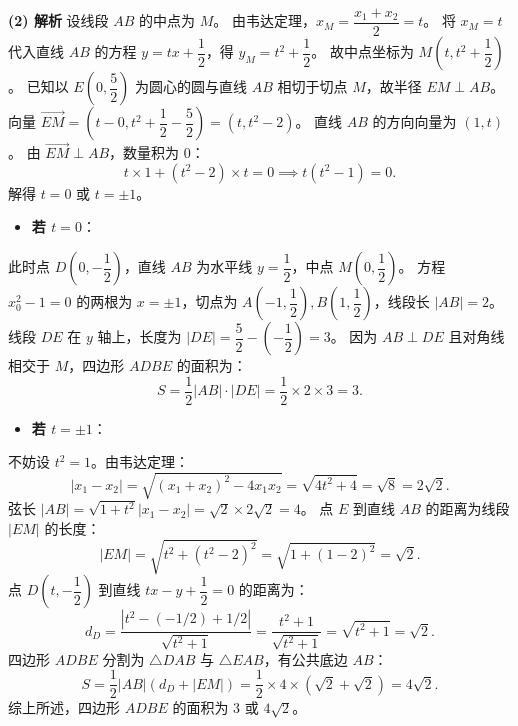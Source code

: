 \begin{answer}
\textbf{(2) 解析}
设线段 $AB$ 的中点为 $M$。
由韦达定理，$x_M = \dfrac{x_1 + x_2}{2} = t$。
将 $x_M = t$ 代入直线 $AB$ 的方程 $y = tx + \dfrac{1}{2}$，得 $y_M = t^2 + \dfrac{1}{2}$。
故中点坐标为 $M\left(t, t^2 + \dfrac{1}{2}\right)$。
已知以 $E\left(0, \dfrac{5}{2}\right)$ 为圆心的圆与直线 $AB$ 相切于切点 $M$，故半径 $EM \perp AB$。
向量 $\vec{EM} = \left(t - 0, t^2 + \dfrac{1}{2} - \dfrac{5}{2}\right) = (t, t^2 - 2)$。
直线 $AB$ 的方向向量为 $(1, t)$。
由 $\vec{EM} \perp AB$，数量积为 0：
\nopagebreak[4]
\[t \times 1 + (t^2 - 2) \times t = 0 \implies t(t^2 - 1) = 0.\]
解得 $t = 0$ 或 $t = \pm 1$。
\begin{itemize}
\item \textbf{若 $t = 0$}：
\end{itemize}
  此时点 $D\left(0, -\dfrac{1}{2}\right)$，直线 $AB$ 为水平线 $y = \dfrac{1}{2}$，中点 $M\left(0, \dfrac{1}{2}\right)$。
  方程 $x_0^2 - 1 = 0$ 的两根为 $x = \pm 1$，切点为 $A\left(-1, \dfrac{1}{2}\right), B\left(1, \dfrac{1}{2}\right)$，线段长 $|AB| = 2$。
  线段 $DE$ 在 $y$ 轴上，长度为 $|DE| = \dfrac{5}{2} - \left(-\dfrac{1}{2}\right) = 3$。
  因为 $AB \perp DE$ 且对角线相交于 $M$，四边形 $ADBE$ 的面积为：
\nopagebreak[4]
\[S = \frac{1}{2} |AB| \cdot |DE| = \frac{1}{2} \times 2 \times 3 = 3.\]
\begin{itemize}
\item \textbf{若 $t = \pm 1$}：
\end{itemize}
  不妨设 $t^2 = 1$。由韦达定理：
\nopagebreak[4]
\[|x_1 - x_2| = \sqrt{(x_1 + x_2)^2 - 4x_1 x_2} = \sqrt{4t^2 + 4} = \sqrt{8} = 2\sqrt{2}.\]
  弦长 $|AB| = \sqrt{1 + t^2} |x_1 - x_2| = \sqrt{2} \times 2\sqrt{2} = 4$。
  点 $E$ 到直线 $AB$ 的距离为线段 $|EM|$ 的长度：
\nopagebreak[4]
\[|EM| = \sqrt{t^2 + (t^2 - 2)^2} = \sqrt{1 + (1 - 2)^2} = \sqrt{2}.\]
  点 $D\left(t, -\dfrac{1}{2}\right)$ 到直线 $tx - y + \dfrac{1}{2} = 0$ 的距离为：
\nopagebreak[4]
\[d_D = \frac{|t^2 - (-1/2) + 1/2|}{\sqrt{t^2 + 1}} = \frac{t^2 + 1}{\sqrt{t^2 + 1}} = \sqrt{t^2 + 1} = \sqrt{2}.\]
  四边形 $ADBE$ 分割为 $\triangle DAB$ 与 $\triangle EAB$，有公共底边 $AB$：
\nopagebreak[4]
\[S = \frac{1}{2} |AB| (d_D + |EM|) = \frac{1}{2} \times 4 \times (\sqrt{2} + \sqrt{2}) = 4\sqrt{2}.\]
综上所述，四边形 $ADBE$ 的面积为 $3$ 或 $4\sqrt{2}$。



\par\medskip

\end{answer}
